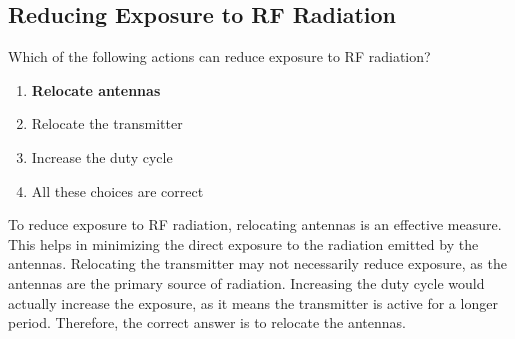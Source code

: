 \subsection{Reducing Exposure to RF Radiation}
\label{T0C08}

\begin{tcolorbox}[colback=gray!10!white,colframe=black!75!black,title=T0C08]
Which of the following actions can reduce exposure to RF radiation?
\begin{enumerate}[noitemsep]
    \item \textbf{Relocate antennas}
    \item Relocate the transmitter
    \item Increase the duty cycle
    \item All these choices are correct
\end{enumerate}
\end{tcolorbox}

To reduce exposure to RF radiation, relocating antennas is an effective measure. This helps in minimizing the direct exposure to the radiation emitted by the antennas. Relocating the transmitter may not necessarily reduce exposure, as the antennas are the primary source of radiation. Increasing the duty cycle would actually increase the exposure, as it means the transmitter is active for a longer period. Therefore, the correct answer is to relocate the antennas.